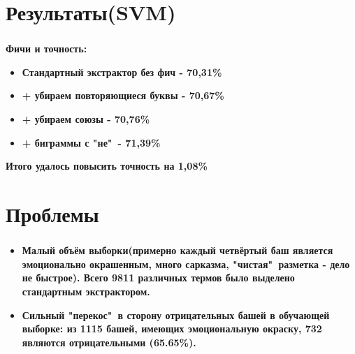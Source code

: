 \documentclass[t]{beamer}
\begin{document}
	\section{Результаты(SVM)}
	\begin{frame}
		\frametitle{\insertsection}
		\textbf{Фичи и точность:}
		\begin{itemize}
			\item \textbf{Стандартный экстрактор без фич - 70,31\%}
			\item \textbf{+ убираем повторяющиеся буквы - 70,67\%}
			\item \textbf{+ убираем союзы - 70,76\%}
			\item \textbf{+ биграммы с "не"\ - 71,39\%}
		\end{itemize}
		\textbf{\newline \newline Итого удалось повысить точность на 1,08\%}
	\end{frame}
	
	
	
	
	
	\section{Проблемы}
	
	\begin{frame}
		\frametitle{\insertsection}
		\begin{itemize}
			\item{\textbf{Малый объём выборки(примерно каждый четвёртый баш является эмоционально окрашенным, много сарказма, "чистая"\ разметка - дело не быстрое). Всего 9811 различных термов было выделено стандартным экстрактором.}}
			\item{\textbf{Сильный "перекос"\ в сторону отрицательных башей в обучающей выборке: из 1115 башей, имеющих эмоциональную окраску, 732 являются отрицательными (65.65\%).}}
		\end{itemize}
	\end{frame}
	
\end{document}
